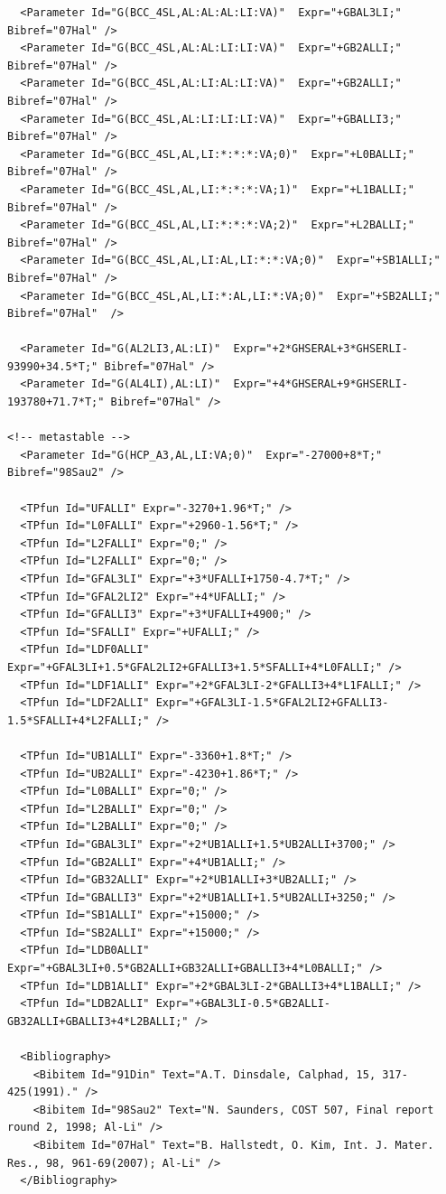 \documentclass{article}
\begin{document}
\begin{appendices}
\begin{verbatim}
  <Parameter Id="G(BCC_4SL,AL:AL:AL:LI:VA)"  Expr="+GBAL3LI;" Bibref="07Hal" />
  <Parameter Id="G(BCC_4SL,AL:AL:LI:LI:VA)"  Expr="+GB2ALLI;" Bibref="07Hal" />
  <Parameter Id="G(BCC_4SL,AL:LI:AL:LI:VA)"  Expr="+GB2ALLI;" Bibref="07Hal" />
  <Parameter Id="G(BCC_4SL,AL:LI:LI:LI:VA)"  Expr="+GBALLI3;" Bibref="07Hal" />
  <Parameter Id="G(BCC_4SL,AL,LI:*:*:*:VA;0)"  Expr="+L0BALLI;" Bibref="07Hal" />
  <Parameter Id="G(BCC_4SL,AL,LI:*:*:*:VA;1)"  Expr="+L1BALLI;" Bibref="07Hal" />
  <Parameter Id="G(BCC_4SL,AL,LI:*:*:*:VA;2)"  Expr="+L2BALLI;" Bibref="07Hal" />
  <Parameter Id="G(BCC_4SL,AL,LI:AL,LI:*:*:VA;0)"  Expr="+SB1ALLI;" Bibref="07Hal" />
  <Parameter Id="G(BCC_4SL,AL,LI:*:AL,LI:*:VA;0)"  Expr="+SB2ALLI;" Bibref="07Hal"  />
  
  <Parameter Id="G(AL2LI3,AL:LI)"  Expr="+2*GHSERAL+3*GHSERLI-93990+34.5*T;" Bibref="07Hal" />
  <Parameter Id="G(AL4LI),AL:LI)"  Expr="+4*GHSERAL+9*GHSERLI-193780+71.7*T;" Bibref="07Hal" />

<!-- metastable -->
  <Parameter Id="G(HCP_A3,AL,LI:VA;0)"  Expr="-27000+8*T;" Bibref="98Sau2" />

  <TPfun Id="UFALLI" Expr="-3270+1.96*T;" />
  <TPfun Id="L0FALLI" Expr="+2960-1.56*T;" />
  <TPfun Id="L2FALLI" Expr="0;" />
  <TPfun Id="L2FALLI" Expr="0;" />
  <TPfun Id="GFAL3LI" Expr="+3*UFALLI+1750-4.7*T;" />
  <TPfun Id="GFAL2LI2" Expr="+4*UFALLI;" />
  <TPfun Id="GFALLI3" Expr="+3*UFALLI+4900;" />
  <TPfun Id="SFALLI" Expr="+UFALLI;" />
  <TPfun Id="LDF0ALLI" Expr="+GFAL3LI+1.5*GFAL2LI2+GFALLI3+1.5*SFALLI+4*L0FALLI;" />
  <TPfun Id="LDF1ALLI" Expr="+2*GFAL3LI-2*GFALLI3+4*L1FALLI;" />
  <TPfun Id="LDF2ALLI" Expr="+GFAL3LI-1.5*GFAL2LI2+GFALLI3-1.5*SFALLI+4*L2FALLI;" />

  <TPfun Id="UB1ALLI" Expr="-3360+1.8*T;" />
  <TPfun Id="UB2ALLI" Expr="-4230+1.86*T;" />
  <TPfun Id="L0BALLI" Expr="0;" />
  <TPfun Id="L2BALLI" Expr="0;" />
  <TPfun Id="L2BALLI" Expr="0;" />
  <TPfun Id="GBAL3LI" Expr="+2*UB1ALLI+1.5*UB2ALLI+3700;" />
  <TPfun Id="GB2ALLI" Expr="+4*UB1ALLI;" />
  <TPfun Id="GB32ALLI" Expr="+2*UB1ALLI+3*UB2ALLI;" />
  <TPfun Id="GBALLI3" Expr="+2*UB1ALLI+1.5*UB2ALLI+3250;" />
  <TPfun Id="SB1ALLI" Expr="+15000;" />
  <TPfun Id="SB2ALLI" Expr="+15000;" />
  <TPfun Id="LDB0ALLI" Expr="+GBAL3LI+0.5*GB2ALLI+GB32ALLI+GBALLI3+4*L0BALLI;" />
  <TPfun Id="LDB1ALLI" Expr="+2*GBAL3LI-2*GBALLI3+4*L1BALLI;" />
  <TPfun Id="LDB2ALLI" Expr="+GBAL3LI-0.5*GB2ALLI-GB32ALLI+GBALLI3+4*L2BALLI;" />

  <Bibliography>
    <Bibitem Id="91Din" Text="A.T. Dinsdale, Calphad, 15, 317-425(1991)." />
    <Bibitem Id="98Sau2" Text="N. Saunders, COST 507, Final report round 2, 1998; Al-Li" />
    <Bibitem Id="07Hal" Text="B. Hallstedt, O. Kim, Int. J. Mater. Res., 98, 961-69(2007); Al-Li" />
  </Bibliography> 


\end{verbatim}
\end{appendices}
\end{document}
